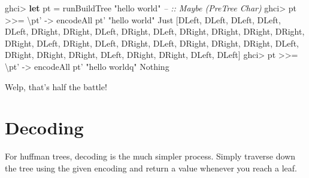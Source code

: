 \documentclass[]{article}
\newenvironment{Shaded}{}{}
\newcommand{\CommentTok}[1]{\textcolor[rgb]{0.38,0.63,0.69}{\textit{#1}}}
\newcommand{\DataTypeTok}[1]{\textcolor[rgb]{0.56,0.13,0.00}{#1}}
\newcommand{\FunctionTok}[1]{\textcolor[rgb]{0.02,0.16,0.49}{#1}}
\newcommand{\KeywordTok}[1]{\textcolor[rgb]{0.00,0.44,0.13}{\textbf{#1}}}
\newcommand{\NormalTok}[1]{#1}
\newcommand{\OtherTok}[1]{\textcolor[rgb]{0.00,0.44,0.13}{#1}}
\newcommand{\StringTok}[1]{\textcolor[rgb]{0.25,0.44,0.63}{#1}}
\begin{document}
\begin{Shaded}
\begin{Highlighting}[]
\NormalTok{ghci}\FunctionTok{>} \KeywordTok{let}\NormalTok{ pt }\FunctionTok{=}\NormalTok{ runBuildTree }\StringTok{"hello world"}          \CommentTok{-- :: Maybe (PreTree Char)}
\NormalTok{ghci}\FunctionTok{>}\NormalTok{ pt }\FunctionTok{>>=}\NormalTok{ \textbackslash{}pt' }\OtherTok{->}\NormalTok{ encodeAll pt' }\StringTok{"hello world"}
\DataTypeTok{Just}\NormalTok{ [}\DataTypeTok{DLeft}\NormalTok{, }\DataTypeTok{DLeft}\NormalTok{, }\DataTypeTok{DLeft}\NormalTok{, }\DataTypeTok{DLeft}\NormalTok{, }\DataTypeTok{DLeft}\NormalTok{, }\DataTypeTok{DRight}\NormalTok{, }\DataTypeTok{DRight}\NormalTok{, }\DataTypeTok{DLeft}\NormalTok{, }\DataTypeTok{DRight}\NormalTok{, }\DataTypeTok{DLeft}\NormalTok{,}
\DataTypeTok{DRight}\NormalTok{, }\DataTypeTok{DRight}\NormalTok{, }\DataTypeTok{DRight}\NormalTok{, }\DataTypeTok{DRight}\NormalTok{, }\DataTypeTok{DRight}\NormalTok{, }\DataTypeTok{DLeft}\NormalTok{, }\DataTypeTok{DRight}\NormalTok{, }\DataTypeTok{DLeft}\NormalTok{, }\DataTypeTok{DRight}\NormalTok{, }\DataTypeTok{DLeft}\NormalTok{,}
\DataTypeTok{DRight}\NormalTok{, }\DataTypeTok{DRight}\NormalTok{, }\DataTypeTok{DRight}\NormalTok{, }\DataTypeTok{DLeft}\NormalTok{, }\DataTypeTok{DRight}\NormalTok{, }\DataTypeTok{DRight}\NormalTok{, }\DataTypeTok{DRight}\NormalTok{, }\DataTypeTok{DLeft}\NormalTok{, }\DataTypeTok{DRight}\NormalTok{, }\DataTypeTok{DRight}\NormalTok{,}
\DataTypeTok{DLeft}\NormalTok{, }\DataTypeTok{DLeft}\NormalTok{]}
\NormalTok{ghci}\FunctionTok{>}\NormalTok{ pt }\FunctionTok{>>=}\NormalTok{ \textbackslash{}pt' }\OtherTok{->}\NormalTok{ encodeAll pt' }\StringTok{"hello worldq"}
\DataTypeTok{Nothing}
\end{Highlighting}
\end{Shaded}

Welp, that's half the battle!

\hypertarget{decoding}{%
\section{Decoding}\label{decoding}}

For huffman trees, decoding is the much simpler process. Simply traverse down
the tree using the given encoding and return a value whenever you reach a leaf.
\end{document}
